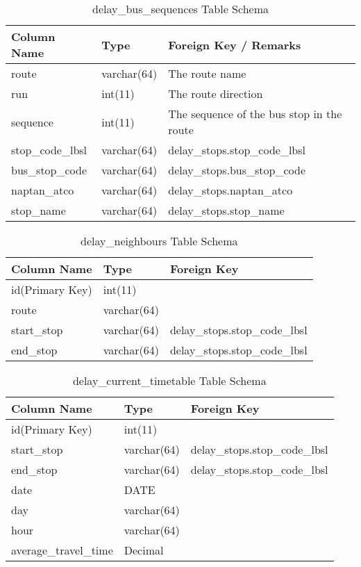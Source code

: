 \begin{appendices}
\begin{table}
\centering
\begin{tabular}{@{}lll@{}} \toprule
Column Name & Type & Foreign Key / Remarks\\ \midrule
route & varchar(64) &  The route name\\
run & int(11) & The route direction\\
sequence & int(11) & The sequence of the bus stop in the route\\
stop\_code\_lbsl & varchar(64) & delay\_stops.stop\_code\_lbsl \\
bus\_stop\_code & varchar(64) & delay\_stops.bus\_stop\_code\\
naptan\_atco & varchar(64) & delay\_stops.naptan\_atco \\
stop\_name & varchar(64) & delay\_stops.stop\_name\\ \bottomrule
\end{tabular}
\caption{delay\_bus\_sequences Table Schema}
\label{table:delay_bus_sequences}
\end{table}


\begin{table}
\centering
\begin{tabular}{@{}lll@{}} \toprule
Column Name & Type & Foreign Key\\ \midrule
id(Primary Key) & int(11)  \\
route & varchar(64) &  \\
start\_stop & varchar(64) & delay\_stops.stop\_code\_lbsl\\
end\_stop & varchar(64) & delay\_stops.stop\_code\_lbsl\\
\bottomrule
\end{tabular}
\caption{delay\_neighbours Table Schema}
\label{table:delay_neighbours}
\end{table}

\begin{table}
\centering
\begin{tabular}{@{}lll@{}} \toprule
Column Name & Type & Foreign Key\\ \midrule
id(Primary Key) & int(11)  \\
start\_stop & varchar(64) & delay\_stops.stop\_code\_lbsl\\
end\_stop & varchar(64) & delay\_stops.stop\_code\_lbsl\\
date & DATE \\
day & varchar(64) \\
hour & varchar(64) \\
average\_travel\_time & Decimal \\ \bottomrule
\end{tabular}
\caption{delay\_current\_timetable Table Schema}
\label{table:delay_current_timetable}
\end{table}


\end{appendices}
